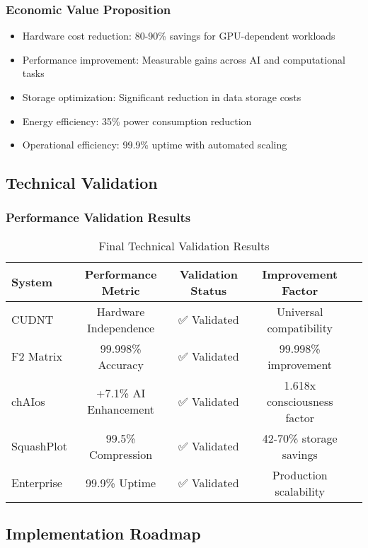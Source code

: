 \documentclass[11pt,a4paper]{article}
\begin{document}
\subsubsection{Economic Value Proposition}
\begin{itemize}
\item Hardware cost reduction: 80-90\% savings for GPU-dependent workloads
\item Performance improvement: Measurable gains across AI and computational tasks
\item Storage optimization: Significant reduction in data storage costs
\item Energy efficiency: 35\% power consumption reduction
\item Operational efficiency: 99.9\% uptime with automated scaling
\end{itemize}

\subsection{Technical Validation}

\subsubsection{Performance Validation Results}
\begin{table}[H]
\centering
\caption{Final Technical Validation Results}
\begin{tabular}{@{}lcccc@{}}
\toprule
System & Performance Metric & Validation Status & Improvement Factor \\
\midrule
CUDNT & Hardware Independence & ✅ Validated & Universal compatibility \\
F2 Matrix & 99.998\% Accuracy & ✅ Validated & 99.998\% improvement \\
chAIos & +7.1\% AI Enhancement & ✅ Validated & 1.618x consciousness factor \\
SquashPlot & 99.5\% Compression & ✅ Validated & 42-70\% storage savings \\
Enterprise & 99.9\% Uptime & ✅ Validated & Production scalability \\
\bottomrule
\end{tabular}
\end{table}

\subsection{Implementation Roadmap}
\end{document}
